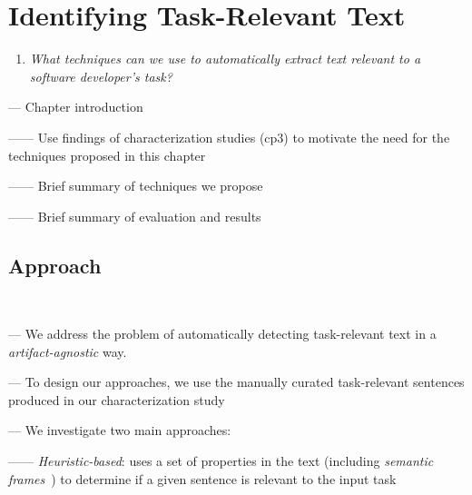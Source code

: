 \setcounter{chapter}{3}
\setcounter{rq}{1}


\chapter{Identifying Task-Relevant Text}
\label{ch:identifying}



\vspace{1mm}

\begin{enumerate}[label=\textit{RQ\arabic*},leftmargin=1.4cm]

\item \textit{What techniques can we use to automatically extract text relevant to a software developer's task?} 

\end{enumerate}

\vspace{1mm}

--- Chapter introduction 

------ Use findings of characterization studies (cp3) to motivate the need for the techniques proposed in this chapter

------ Brief summary of techniques we propose

------ Brief summary of evaluation and results



\clearpage


\section{Approach}
\textcolor{white}{force ident} %

--- We address the problem of automatically detecting task-relevant text in a \textit{artifact-agnostic} way. \vspace{3mm}

--- To design our approaches, we use the manually curated task-relevant sentences produced in our characterization study~\cite{marques2020} \vspace{3mm}

--- We investigate two main approaches:

------ \textit{Heuristic-based}: uses a set of properties in the text (including \textit{semantic frames}~\cite{fillmore1976frame}) to determine if a given sentence is relevant to the input task

